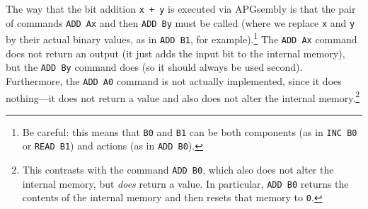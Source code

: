 The way that the bit addition \texttt{x + y} is executed via APGsembly is that the pair of commands \texttt{ADD~Ax} and then \texttt{ADD~By} must be called (where we replace \texttt{x} and \texttt{y} by their actual binary values, as in \texttt{ADD B1}, for example).\footnote{Be careful: this means that \texttt{B0} and \texttt{B1} can be both components (as in \texttt{INC B0} or \texttt{READ B1}) and actions (as in \texttt{ADD B0}).} The \texttt{ADD Ax} command does not return an output (it just adds the input bit to the internal memory), but the \texttt{ADD By} command does (so it should always be used second). Furthermore, the \texttt{ADD A0} command is not actually implemented, since it does nothing---it does not return a value and also does not alter the internal memory.\footnote{This contrasts with the command \texttt{ADD B0}, which also does not alter the internal memory, but \emph{does} return a value. In particular, \texttt{ADD B0} returns the contents of the internal memory and then resets that memory to \texttt{0}.}

